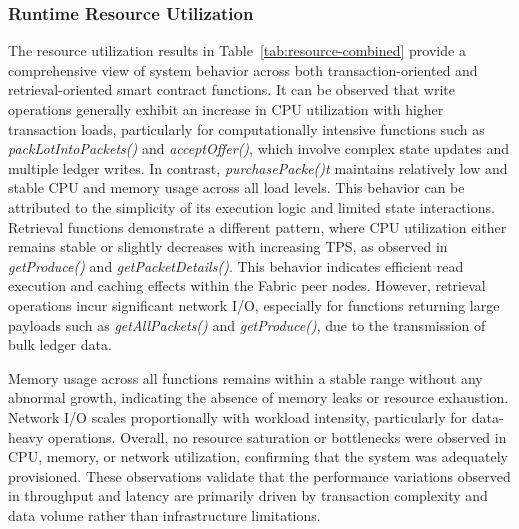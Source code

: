 \documentclass[12pt]{article}
\begin{document}
	\subsubsection{Runtime Resource Utilization}
	
	The resource utilization results in Table~\ref{tab:resource-combined} provide a comprehensive view of system behavior across both transaction-oriented and retrieval-oriented smart contract functions. It can be observed that write operations generally exhibit an increase in CPU utilization with higher transaction loads, particularly for computationally intensive functions such as \textit{packLotIntoPackets()} and \textit{acceptOffer()}, which involve complex state updates and multiple ledger writes. In contrast, \textit{purchasePacke()t} maintains relatively low and stable CPU and memory usage across all load levels. This behavior can be attributed to the simplicity of its execution logic and limited state interactions.
	Retrieval functions demonstrate a different pattern, where CPU utilization either remains stable or slightly decreases with increasing TPS, as observed in \textit{getProduce()} and \textit{getPacketDetails()}. This behavior indicates efficient read execution and caching effects within the Fabric peer nodes. However, retrieval operations incur significant network I/O, especially for functions returning large payloads such as \textit{getAllPackets()} and \textit{getProduce()}, due to the transmission of bulk ledger data.
	
	Memory usage across all functions remains within a stable range without any abnormal growth, indicating the absence of memory leaks or resource exhaustion. Network I/O scales proportionally with workload intensity, particularly for data-heavy operations. Overall, no resource saturation or bottlenecks were observed in CPU, memory, or network utilization, confirming that the system was adequately provisioned. These observations validate that the performance variations observed in throughput and latency are primarily driven by transaction complexity and data volume rather than infrastructure limitations.
	
\end{document}
